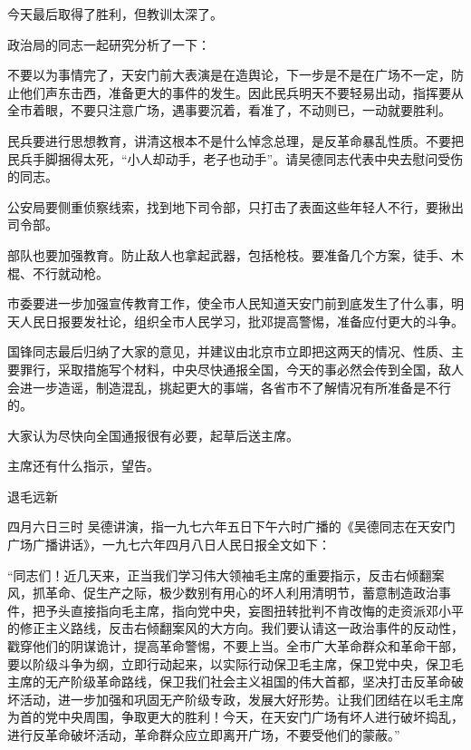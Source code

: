 \begin{maonote}
今天最后取得了胜利，但教训太深了。

政治局的同志一起研究分析了一下：

不要以为事情完了，天安门前大表演是在造舆论，下一步是不是在广场不一定，防止他们声东击西，准备更大的事件的发生。因此民兵明天不要轻易出动，指挥要从全市着眼，不要只注意广场，遇事要沉着，看准了，不动则已，一动就要胜利。

民兵要进行思想教育，讲清这根本不是什么悼念总理，是反革命暴乱性质。不要把民兵手脚捆得太死，“小人却动手，老子也动手”。请吴德同志代表中央去慰问受伤的同志。

公安局要侧重侦察线索，找到地下司令部，只打击了表面这些年轻人不行，要揪出司令部。

部队也要加强教育。防止敌人也拿起武器，包括枪枝。要准备几个方案，徒手、木棍、不行就动枪。

市委要进一步加强宣传教育工作，使全市人民知道天安门前到底发生了什么事，明天人民日报要发社论，组织全市人民学习，批邓提高警惕，准备应付更大的斗争。

国锋同志最后归纳了大家的意见，并建议由北京市立即把这两天的情况、性质、主要罪行，采取措施写个材料，中央尽快通报全国，今天的事必然会传到全国，敌人会进一步造谣，制造混乱，挑起更大的事端，各省市不了解情况有所准备是不行的。

大家认为尽快向全国通报很有必要，起草后送主席。

主席还有什么指示，望告。

退毛远新

四月六日三时
吴德讲演，指一九七六年五日下午六时广播的《吴德同志在天安门广场广播讲话》，一九七六年四月八日人民日报全文如下：

“同志们！近几天来，正当我们学习伟大领袖毛主席的重要指示，反击右倾翻案风，抓革命、促生产之际，极少数别有用心的坏人利用清明节，蓄意制造政治事件，把予头直接指向毛主席，指向党中央，妄图扭转批判不肯改悔的走资派邓小平的修正主义路线，反击右倾翻案风的大方向。我们要认请这一政治事件的反动性，戳穿他们的阴谋诡计，提高革命警惕，不要上当。全市广大革命群众和革命干部，要以阶级斗争为纲，立即行动起来，以实际行动保卫毛主席，保卫党中央，保卫毛主席的无产阶级革命路线，保卫我们社会主义祖国的伟大首都，坚决打击反革命破坏活动，进一步加强和巩固无产阶级专政，发展大好形势。让我们团结在以毛主席为首的党中央周围，争取更大的胜利！今天，在天安门广场有坏人进行破坏捣乱，进行反革命破坏活动，革命群众应立即离开广场，不要受他们的蒙蔽。”


\end{maonote}
